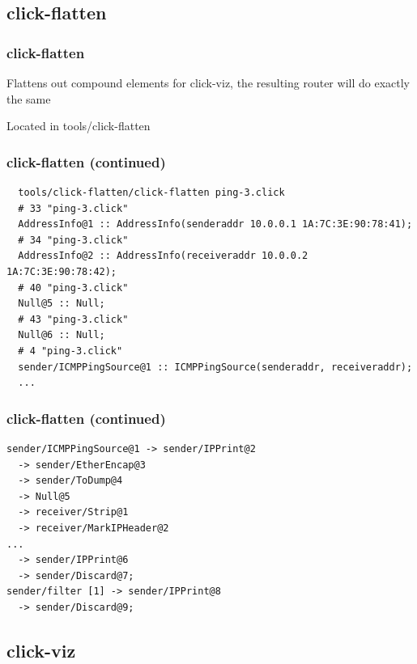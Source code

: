 \documentclass{beamer}
\begin{document}
\subsection{click-flatten} %
\label{sub:click_flatten}

\begin{frame}[fragile]
\frametitle{click-flatten}
Flattens out compound elements for click-viz, the resulting router will do exactly the same

Located in tools/click-flatten
\end{frame}

\begin{frame}[fragile]
\frametitle{click-flatten (continued)}
\begin{lstlisting}
  tools/click-flatten/click-flatten ping-3.click
  # 33 "ping-3.click"
  AddressInfo@1 :: AddressInfo(senderaddr 10.0.0.1 1A:7C:3E:90:78:41);
  # 34 "ping-3.click"
  AddressInfo@2 :: AddressInfo(receiveraddr 10.0.0.2 1A:7C:3E:90:78:42);
  # 40 "ping-3.click"
  Null@5 :: Null;
  # 43 "ping-3.click"
  Null@6 :: Null;
  # 4 "ping-3.click"
  sender/ICMPPingSource@1 :: ICMPPingSource(senderaddr, receiveraddr);
  ...
\end{lstlisting}
\end{frame}

\begin{frame}[fragile]
\frametitle{click-flatten (continued)}
\begin{lstlisting}
sender/ICMPPingSource@1 -> sender/IPPrint@2
  -> sender/EtherEncap@3
  -> sender/ToDump@4
  -> Null@5
  -> receiver/Strip@1
  -> receiver/MarkIPHeader@2
...
  -> sender/IPPrint@6
  -> sender/Discard@7;
sender/filter [1] -> sender/IPPrint@8
  -> sender/Discard@9;
\end{lstlisting}
\end{frame}
\subsection{click-viz} %
\label{sub:click_viz}
\end{document}

